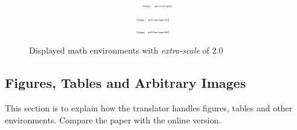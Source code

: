 \begin{figure}[ht]
\begin{equation}
 \setbox1=\hbox{\scalebox{.3}{\texttt{[image: psfiles/eqn2]}}}
 \lower.5\ht1 \box1
\end{equation}
\begin{eqnarray}
 \nonumber
 \setbox1=\hbox{\scalebox{.3}{\texttt{[image: psfiles/eqarrA2]}}}
 \lower.5\ht1 \box1&&\\
 \setbox1=\hbox{\scalebox{.3}{\texttt{[image: psfiles/eqarrB2]}}}
 \lower.5\ht1 \box1&&
\end{eqnarray}
\caption{Displayed math environments with \emph{extra-scale} of 2.0}
\label{eq:pics2}
\end{figure}



\subsection{Figures, Tables and Arbitrary Images\label{sec:figs}}
%
\html{\\}%
This section is to explain how the translator handles figures, tables
and other environments. 
Compare the paper with the online version.

